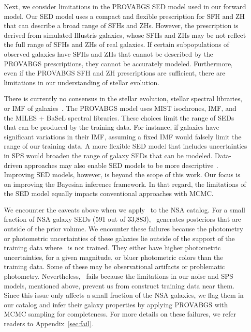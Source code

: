 Next, we consider limitations in the PROVABGS SED model used in our forward
model. 
Our SED model uses a compact and flexible prescription for SFH and ZH that can
describe a broad range of SFHs and ZHs.
However, the prescription is derived from simulated Illustris galaxies, whose
SFHs and ZHs may be not reflect the full range of SFHs and ZHs of real
galaxies.
If certain subpopulations of observed galaxies have SFHs and ZHs that cannot be
described by the PROVABGS prescriptions, they cannot be accurately
modeled. 
Furthermore, even if the PROVABGS SFH and ZH prescriptions are sufficient,
there are limitations in our understanding of stellar evolution. 

There is currently no consensus in the stellar evolution, stellar spectral
libraries, or IMF of galaxies~\citep[\emph{e.g.}][]{treu2010, vandokkum2010,
rosani2018, ge2019, sonnenfeld2019}.
The PROVABGS model uses MIST isochrones, \cite{chabrier2003} IMF, and the MILES
+ BaSeL spectral libraries. 
These choices limit the range of SEDs that can be produced by the training data. 
For instance, if galaxies have significant variations in their IMF, assuming a
fixed IMF would falsely limit the range of our training data.  
A more flexible SED model that includes uncertainties in SPS would broaden the
range of galaxy SEDs that can be modeled.
Data-driven approaches may also enable SED models to be more
descriptive~\citep[\emph{e.g.}][]{hogg2016, portillo2020}. 
Improving  SED models, however, is beyond the scope of this work. 
Our focus is on improving the Bayesian inference framework.
In that regard, the limitations of the SED model equally impacts conventional
approaches with MCMC. 

We encounter the caveats above when we apply \sedflow~to the NSA catalog. 
For a small fraction of NSA galaxy SEDs (591 out of 33,883), \sedflow~generates
posteriors that are outside of the prior volume. 
We encounter these failures because the photometry or photometric uncertainties
of these galaxies lie outside of the support of the training data where
\sedflow~is not trained. 
They either have higher photometric uncertainties, for a given magnitude, or
bluer photometric colors than the training data. 
Some of these may be observational artifacts or problematic photometry.
Nevertheless, \sedflow~fails because the limitations in our noise and SPS
models, mentioned above, prevent us from construct training data near them. 
Since this issue only affects a small fraction of the NSA galaxies, we flag
them in our catalog and infer their galaxy properties by applying PROVABGS with
MCMC sampling for completeness.
For more details on these failures, we refer readers to
Appendix~\ref{sec:fail}.

